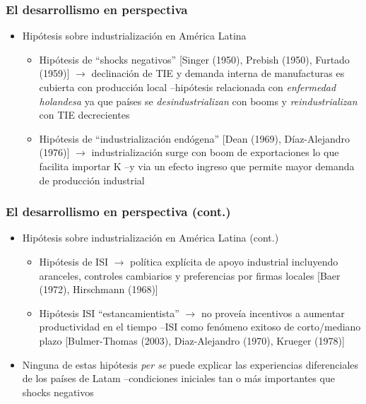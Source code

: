 \documentclass[14pt,aspectratio=169]{beamer}
\begin{document}
               \begin{frame}\frametitle{El desarrollismo en
                   perspectiva}
    \begin{itemize}\itemsep 10pt
    \item Hipótesis sobre industrialización en América Latina
      \begin{itemize}\itemsep 5pt \medskip
      \item Hipótesis de ``shocks negativos'' [Singer (1950), Prebish (1950), Furtado
        (1959)] $\longrightarrow$ declinación de TIE y demanda interna
        de manufacturas es cubierta con producción local --hipótesis
        relacionada con \textit{enfermedad holandesa} ya que países se
        \textit{desindustrializan} con booms y
        \textit{reindustrializan} con TIE decrecientes
        \item Hipótesis de ``industrialización endógena'' [Dean
          (1969), Díaz-Alejandro (1976)] $\longrightarrow$
          industrialización surge con boom de exportaciones lo que
          facilita importar K --y via un efecto ingreso que permite
          mayor demanda de producción industrial
        \end{itemize}
                        \end{itemize}
               \end{frame}




               

 \begin{frame}\frametitle{El desarrollismo en perspectiva (cont.)}
    \begin{itemize}\itemsep 10pt
    \item Hipótesis sobre industrialización en América Latina (cont.)
      \begin{itemize}\itemsep 5pt \medskip
      \item Hipótesis de ISI $\longrightarrow$ política explícita de
        apoyo industrial incluyendo aranceles, controles cambiarios y
        preferencias por firmas locales [Baer (1972), Hirschmann (1968)]
        \item Hipótesis ISI ``estancamientista'' $\longrightarrow$ no
          proveía incentivos a aumentar productividad en el tiempo
          --ISI como fenómeno exitoso de corto/mediano plazo
          [Bulmer-Thomas (2003), Diaz-Alejandro (1970), Krueger (1978)]
        \end{itemize}
        \item Ninguna de estas hipótesis \textit{per se} puede
          explicar las experiencias diferenciales de los países de
          Latam --condiciones iniciales tan o más importantes que
          shocks negativos
                        \end{itemize}
               \end{frame}
\end{document}
